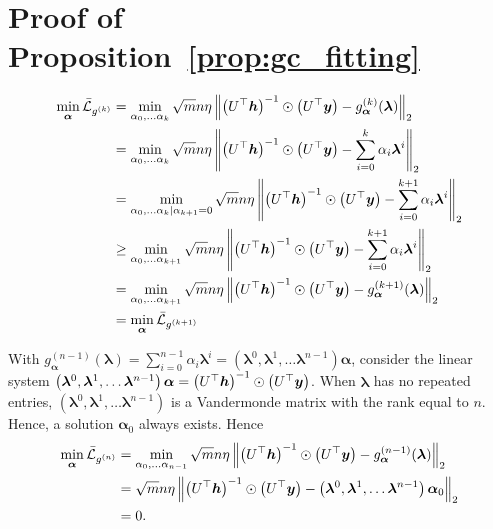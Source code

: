 \documentclass{article} %
\def\valpha{{\bm\alpha}}
\def\vlambda{{\bm\lambda}}
\begin{document}
\section{Proof of Proposition~\ref{prop:gc_fitting}}
\label{sec:gc_fitting}
\begin{equation}
	\begin{aligned}
		\min_{\valpha}\bar\gL_{g^{(k)}}&=\min_{\alpha_0,\dots\alpha_k}\sqrt{m}n\eta\left\|\left(U^{\top}\vh\right)^{-1}\odot\left(U^{\top}\vy\right)-g_{\valpha}^{(k)}(\vlambda)\right\|_2\\
		&=\min_{\alpha_0,\dots\alpha_k}\sqrt{m}n\eta\left\|\left(U^{\top}\vh\right)^{-1}\odot\left(U^{\top}\vy\right)-\sum_{i=0}^k\alpha_i\vlambda^i\right\|_2\\
		&=\min_{\alpha_0,\dots\alpha_k|\alpha_{k+1}=0}\sqrt{m}n\eta\left\|\left(U^{\top}\vh\right)^{-1}\odot\left(U^{\top}\vy\right)-\sum_{i=0}^{k+1}\alpha_i\vlambda^i\right\|_2\\
		&\geq\min_{\alpha_0,\dots\alpha_{k+1}}\sqrt{m}n\eta\left\|\left(U^{\top}\vh\right)^{-1}\odot\left(U^{\top}\vy\right)-\sum_{i=0}^{k+1}\alpha_i\vlambda^i\right\|_2\\
		&=\min_{\alpha_0,\dots\alpha_{k+1}}\sqrt{m}n\eta\left\|\left(U^{\top}\vh\right)^{-1}\odot\left(U^{\top}\vy\right)-g_{\valpha}^{(k+1)}(\vlambda)\right\|_2\\
		&=\min_{\valpha}\bar\gL_{g^{(k+1)}}
	\end{aligned}
\end{equation}

With $g_{\valpha}^{(n-1)}(\vlambda)=\sum_{i=0}^{n-1}\alpha_i\vlambda^i=\left(\vlambda^0,\vlambda^1,\dots\vlambda^{n-1}\right)\valpha$, consider the linear system $\left(\vlambda^0,\vlambda^1,\dots\vlambda^{n-1}\right)\valpha=\left(U^{\top}\vh\right)^{-1}\odot\left(U^{\top}\vy\right)$.
When $\vlambda$ has no repeated entries, $\left(\vlambda^0,\vlambda^1,\dots\vlambda^{n-1}\right)$ is a Vandermonde matrix with the rank equal to $n$.
Hence, a solution $\valpha_0$ always exists.
Hence
\begin{equation}
	\begin{aligned}
		\min_{\valpha}\bar\gL_{g^{(n)}}&=\min_{\alpha_0,\dots\alpha_{n-1}}\sqrt{m}n\eta\left\|\left(U^{\top}\vh\right)^{-1}\odot\left(U^{\top}\vy\right)-g_{\valpha}^{(n-1)}(\vlambda)\right\|_2\\
		&=\sqrt{m}n\eta\left\|\left(U^{\top}\vh\right)^{-1}\odot\left(U^{\top}\vy\right)-\left(\vlambda^0,\vlambda^1,\dots\vlambda^{n-1}\right)\valpha_0\right\|_2\\
		&=0.
	\end{aligned}
\end{equation}
\end{document}
